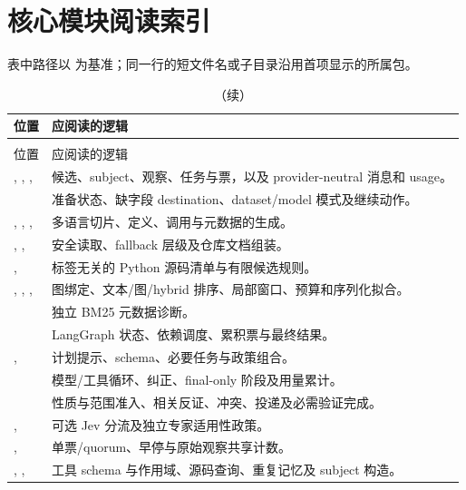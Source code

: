 \section{核心模块阅读索引}
表中路径以  为基准；同一行的短文件名或子目录沿用首项显示的所属包。
\begin{longtable}{L{66mm}L{83mm}}
\caption{源码定位与理解顺序。所有路径均以  为前缀。}\\
\toprule 位置 & 应阅读的逻辑\\\midrule\endfirsthead
\caption[]{（续）}\\
\toprule 位置 & 应阅读的逻辑\\\midrule\endhead
{}, , ,  & 候选、subject、观察、任务与票，以及 provider-neutral 消息和 usage。\\
 & 准备状态、缺字段 destination、dataset/model 模式及继续动作。\\
, , ,  & 多语言切片、定义、调用与元数据的生成。\\
, ,  & 安全读取、fallback 层级及仓库文档组装。\\
,  & 标签无关的 Python 源码清单与有限候选规则。\\
, , ,  & 图绑定、文本/图/hybrid 排序、局部窗口、预算和序列化拟合。\\
 & 独立 BM25 元数据诊断。\\
 & LangGraph 状态、依赖调度、累积票与最终结果。\\
,  & 计划提示、schema、必要任务与政策组合。\\
 & 模型/工具循环、纠正、final-only 阶段及用量累计。\\
 & 性质与范围准入、相关反证、冲突、投递及必需验证完成。\\
,  & 可选 Jev 分流及独立专家适用性政策。\\
,  & 单票/quorum、早停与原始观察共享计数。\\
, ,  & 工具 schema 与作用域、源码查询、重复记忆及 subject 构造。\\

\end{longtable}

